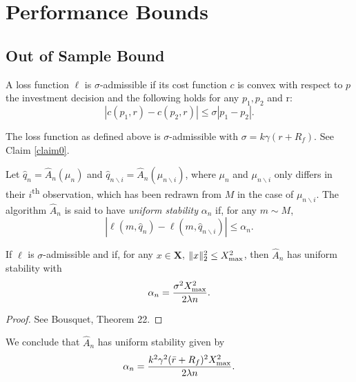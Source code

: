 \documentclass[11pt]{article}
\begin{document}
\section{Performance Bounds}

\subsection{Out of Sample Bound}

\begin{deff}
  A loss function $\ell$ is $\sigma$-admissible if its cost function $c$ is convex with
  respect to $p$ the investment decision and the following holds for any $p_1,p_2$ and r:
  \begin{equation*}
    |c(p_1,r) - c(p_2,r)| \leq \sigma|p_1-p_2|.
  \end{equation*}
\end{deff}

\begin{rem}
  The loss function as defined above is $\sigma$-admissible with $\sigma=k\gamma(r+R_f)$. See
  Claim \ref{claim0}.
\end{rem}

\begin{deff}
  Let $\hat q_n=\hat A_n(\mu_n)$ and
  $\hat q_{n\backslash i}=\hat A_n(\mu_{n\backslash i})$, where $\mu_n$ and
  $\mu_{n\backslash i}$ only differs in their $i$\textsuperscript{th} observation, which
  has been redrawn from $M$ in the case of $\mu_{n\backslash i}$. The algorithm $\hat A_n$
  is said to have \textsl{uniform stability} $\alpha_n$ if, for any $m\sim M$,
  \begin{equation*}
    |\ell(m,\hat q_n) - \ell(m,\hat q_{n\backslash i})| \leq \alpha_n. 
  \end{equation*}
\end{deff}

\begin{thm}
  If $\ell$ is $\sigma$-admissible and if, for any $x\in\bm X$, $\|x\|_2^2\leq X_{\max}^2$,
  then $\hat A_n$ has uniform stability with
  \begin{equation*}
    \alpha_n = \frac{\sigma^2 X_{\max}^2}{2\lambda n}.
  \end{equation*}
\end{thm}

\begin{proof}
  See Bousquet, Theorem 22. 
\end{proof}

\begin{rem}
  We conclude that $\hat A_n$ has uniform stability given by
  \begin{equation*}
    \alpha_n = \frac{k^2\gamma^2(\bar r+R_f)^2X_{\max}^2}{2\lambda n}.
  \end{equation*}
\end{rem}
\end{document}
